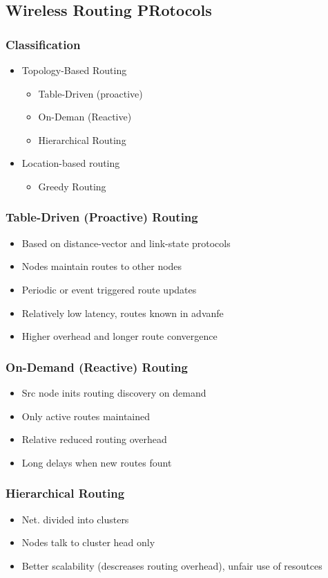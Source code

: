 \documentclass[a4paper]{article}
\begin{document}
\subsection{Wireless Routing PRotocols}
\subsubsection{Classification}
\begin{itemize}
	\item Topology-Based Routing
	\begin{itemize}
		\item Table-Driven (proactive)
		\item On-Deman (Reactive)
		\item Hierarchical Routing
	\end{itemize}
	\item Location-based routing
	\begin{itemize}
		\item Greedy Routing
	\end{itemize}
\end{itemize}
\subsubsection{Table-Driven (Proactive) Routing}
\begin{itemize}
	\item Based on distance-vector and link-state protocols
	\item Nodes maintain routes to other nodes
	\item Periodic or event triggered route updates
	\item Relatively low latency, routes known in advanfe
	\item Higher overhead and longer route convergence
\end{itemize}
\subsubsection{On-Demand (Reactive) Routing}
\begin{itemize}
	\item Src node inits routing discovery on demand
	\item Only active routes maintained
	\item Relative reduced routing overhead
	\item Long delays when new routes fount
\end{itemize}
\subsubsection{Hierarchical Routing}
\begin{itemize}
	\item Net. divided into clusters
	\item Nodes talk to cluster head only
	\item Better scalability (descreases routing overhead), unfair use of
		resoutces
\end{itemize}
\end{document}
